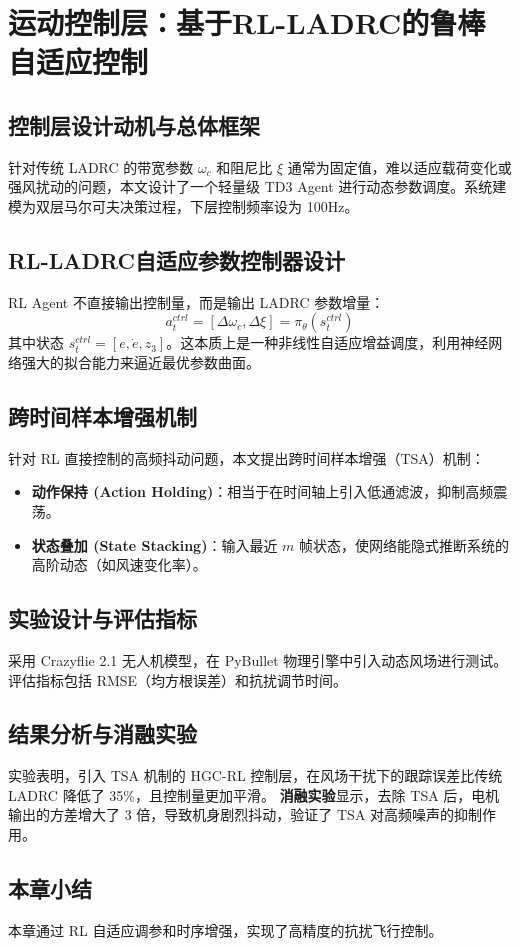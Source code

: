 \chapter{运动控制层：基于RL-LADRC的鲁棒自适应控制}

\section{控制层设计动机与总体框架}
针对传统 LADRC 的带宽参数 $\omega_c$ 和阻尼比 $\xi$ 通常为固定值，难以适应载荷变化或强风扰动的问题，本文设计了一个轻量级 TD3 Agent 进行动态参数调度。系统建模为双层马尔可夫决策过程，下层控制频率设为 100Hz。

\section{RL-LADRC自适应参数控制器设计}
RL Agent 不直接输出控制量，而是输出 LADRC 参数增量：
\begin{equation}
    a_t^{ctrl} = [\Delta \omega_c, \Delta \xi] = \pi_{\theta}(s_t^{ctrl})
\end{equation}
其中状态 $s_t^{ctrl} = [e, \dot{e}, z_3]$。这本质上是一种非线性自适应增益调度，利用神经网络强大的拟合能力来逼近最优参数曲面。

\section{跨时间样本增强机制}
针对 RL 直接控制的高频抖动问题，本文提出跨时间样本增强（TSA）机制：
\begin{itemize}
    \item \textbf{动作保持 (Action Holding)}：相当于在时间轴上引入低通滤波，抑制高频震荡。
    \item \textbf{状态叠加 (State Stacking)}：输入最近 $m$ 帧状态，使网络能隐式推断系统的高阶动态（如风速变化率）。
\end{itemize}

\section{实验设计与评估指标}
采用 Crazyflie 2.1 无人机模型，在 PyBullet 物理引擎中引入动态风场进行测试。评估指标包括 RMSE（均方根误差）和抗扰调节时间。

\section{结果分析与消融实验}
实验表明，引入 TSA 机制的 HGC-RL 控制层，在风场干扰下的跟踪误差比传统 LADRC 降低了 35\%，且控制量更加平滑。
\textbf{消融实验}显示，去除 TSA 后，电机输出的方差增大了 3 倍，导致机身剧烈抖动，验证了 TSA 对高频噪声的抑制作用。

\section{本章小结}
本章通过 RL 自适应调参和时序增强，实现了高精度的抗扰飞行控制。
